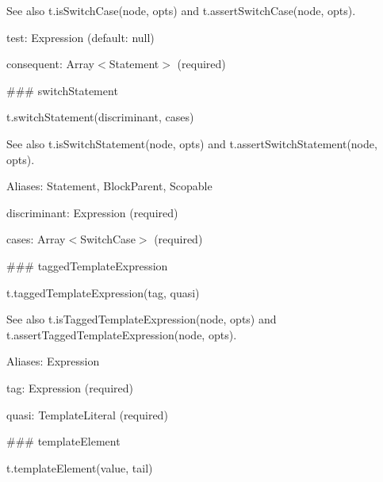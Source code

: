 See also {\ttfamily t.\+is\+Switch\+Case(node, opts)} and {\ttfamily t.\+assert\+Switch\+Case(node, opts)}.


\begin{DoxyItemize}
\item {\ttfamily test}\+: {\ttfamily Expression} (default\+: {\ttfamily null})
\item {\ttfamily consequent}\+: {\ttfamily Array$<$Statement$>$} (required) 


\end{DoxyItemize}

\#\#\# switch\+Statement 
\begin{DoxyCode}
t.switchStatement(discriminant, cases)
\end{DoxyCode}


See also {\ttfamily t.\+is\+Switch\+Statement(node, opts)} and {\ttfamily t.\+assert\+Switch\+Statement(node, opts)}.

Aliases\+: {\ttfamily Statement}, {\ttfamily Block\+Parent}, {\ttfamily Scopable}


\begin{DoxyItemize}
\item {\ttfamily discriminant}\+: {\ttfamily Expression} (required)
\item {\ttfamily cases}\+: {\ttfamily Array$<$Switch\+Case$>$} (required) 


\end{DoxyItemize}

\#\#\# tagged\+Template\+Expression 
\begin{DoxyCode}
t.taggedTemplateExpression(tag, quasi)
\end{DoxyCode}


See also {\ttfamily t.\+is\+Tagged\+Template\+Expression(node, opts)} and {\ttfamily t.\+assert\+Tagged\+Template\+Expression(node, opts)}.

Aliases\+: {\ttfamily Expression}


\begin{DoxyItemize}
\item {\ttfamily tag}\+: {\ttfamily Expression} (required)
\item {\ttfamily quasi}\+: {\ttfamily Template\+Literal} (required) 


\end{DoxyItemize}

\#\#\# template\+Element 
\begin{DoxyCode}
t.templateElement(value, tail)
\end{DoxyCode}


